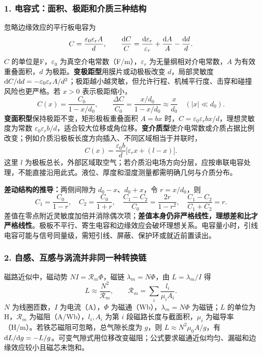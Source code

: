 \subsubsection*{1. 电容式：面积、极距和介质三种结构}
忽略边缘效应的平行板电容为
\[
C=\frac{\varepsilon_0\varepsilon_rA}{d},\qquad
\frac{\mathrm{d} C}{C}=\frac{\mathrm{d}\varepsilon_r}{\varepsilon_r}
+\frac{\mathrm{d} A}{A}-\frac{\mathrm{d} d}{d}.
\]
$C$ 的单位是F，$\varepsilon_0$ 为真空介电常数（F/m），$\varepsilon_r$ 为无量纲相对介电常数，$A$ 为有效重叠面积，$d$ 为极距。\textbf{变极距型}用膜片或动极板改变 $d$，局部灵敏度 $\mathrm{d} C/\mathrm{d} d=-\varepsilon_0\varepsilon_rA/d^2$；极距越小越灵敏，但允许行程、机械平行度、击穿和碰撞风险也更严格。若 $x>0$ 表示极距缩小，
\[
C(x)=\frac{C_0}{1-x/d_0},\qquad
\frac{\Delta C}{C_0}=\frac{x/d_0}{1-x/d_0}\approx\frac{x}{d_0}
\quad(|x|\ll d_0).
\]
\textbf{变面积型}保持极距不变，矩形极板重叠面积 $A=bx$ 时，$C=\varepsilon_0\varepsilon_r bx/d$，理想灵敏度为常数 $\varepsilon_0\varepsilon_r b/d$，适合较大位移或角位移。\textbf{变介质型}使介电常数或介质占据比例改变；例如介质沿极板长度方向插入、不同区域相当于并联时，
\[
C(x)=\frac{\varepsilon_0 b}{d}
\bigl[\varepsilon_r x+(l-x)\bigr].
\]
这里 $l$ 为极板总长，外部区域取空气；若介质沿电场方向分层，应按串联电容处理，不能直接沿用此式。液位、厚度和湿度测量都需明确几何与介质分布。

\textbf{差动结构的推导：}两侧间隙为 $d_0-x$、$d_0+x$，令 $r=x/d_0$，则
\[
C_1=\frac{C_0}{1-r},\quad C_2=\frac{C_0}{1+r},\quad
\frac{C_1-C_2}{C_0}=\frac{2r}{1-r^2},\quad
\boxed{\frac{C_1-C_2}{C_1+C_2}=r}.
\]
差值在零点附近灵敏度加倍并消除偶次项；\textbf{差值本身仍非严格线性，理想差和比才严格线性}。极板不平行、寄生电容和边缘效应会破坏理想关系。电容量小时，引线电容可能与信号同量级，需短引线、屏蔽、保护环或就近前置读出。

\subsubsection*{2. 自感、互感与涡流并非同一种转换链}
磁路近似中，磁动势 $NI=\mathcal R_m\Phi$，磁链 $\lambda_m=N\Phi$，由 $L=\lambda_m/I$ 得
\[
\boxed{L\approx\frac{N^2}{\mathcal R_m}},\qquad
\mathcal R_m=\sum_i\frac{l_i}{\mu_iA_i}.
\]
$N$ 为线圈匝数，$I$ 为电流（A），$\Phi$ 为磁通（Wb），$\lambda_m=N\Phi$ 为磁链；$L$ 的单位为H，$\mathcal R_m$ 为磁阻（A/Wb），$l_i,A_i$ 为第 $i$ 段磁路长度与截面积，$\mu_i$ 为磁导率（H/m）。若铁芯磁阻可忽略，总气隙长度为 $g$，则 $L\approx N^2\mu_0A/g$，有 $\mathrm{d} L/\mathrm{d} g=-L/g$。可变气隙式用位移改变磁阻；公式要求磁通近似均匀、漏磁和边缘效应较小且磁芯未饱和。


